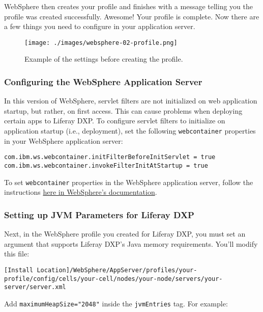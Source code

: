 WebSphere then creates your profile and finishes with a message telling
you the profile was created successfully. Awesome! Your profile is
complete. Now there are a few things you need to configure in your
application server.

\begin{figure}
\centering
\texttt{[image: ./images/websphere-02-profile.png]}
\caption{Example of the settings before creating the profile.}
\end{figure}

\subsubsection{Configuring the WebSphere Application
Server}\label{configuring-the-websphere-application-server}

In this version of WebSphere, servlet filters are not initialized on web
application startup, but rather, on first access. This can cause
problems when deploying certain apps to Liferay DXP. To configure
servlet filters to initialize on application startup (i.e., deployment),
set the following \texttt{webcontainer} properties in your WebSphere
application server:

\begin{verbatim}
com.ibm.ws.webcontainer.initFilterBeforeInitServlet = true
com.ibm.ws.webcontainer.invokeFilterInitAtStartup = true
\end{verbatim}

To set \texttt{webcontainer} properties in the WebSphere application
server, follow the instructions
\href{http://www-01.ibm.com/support/docview.wss?rss=180&uid=swg21284395}{here
in WebSphere's documentation}.

\subsubsection{Setting up JVM Parameters for Liferay
DXP}\label{setting-up-jvm-parameters-for-liferay-dxp}

Next, in the WebSphere profile you created for Liferay DXP, you must set
an argument that supports Liferay DXP's Java memory requirements. You'll
modify this file:

\begin{verbatim}
[Install Location]/WebSphere/AppServer/profiles/your-profile/config/cells/your-cell/nodes/your-node/servers/your-server/server.xml
\end{verbatim}

Add \texttt{maximumHeapSize="2048"} inside the \texttt{jvmEntries} tag.
For example:


